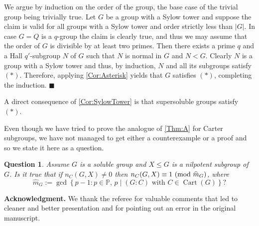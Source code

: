 \documentclass[a4paper,12pt,reqno]{amsart}
\newtheorem{question}{Question}
\numberwithin{equation}{section}
\DeclareMathOperator{\cart}{Cart}
\renewcommand{\leq}{\leqslant}
\newcommand{\md}[1]{\,\left(\textnormal{mod}\ #1\right)}
\newenvironment{proofof}{{\bf {Proof.} }}{\hfill $\blacksquare$ \\}
\begin{document}
\begin{proofof}
We argue by induction on the order of the group,
the base case of the trivial group being trivially true.
Let $G$ be a group with a Sylow tower and suppose the
claim is valid for all groups with a Sylow tower and order
strictly less than $|G|$. In case $G=Q$ is a $q$-group the claim is clearly true, and thus we may assume that the order of $G$  is divisible by at least two primes.  
Then there exists a prime $q$ and a Hall $q'$-subgroup $N$
of $G$ such that $N$ is normal in $G$ and $N < G$. 
Clearly $N$ is a  group with a Sylow tower and thus, by induction, 
$N$ and all its subgroups satisfy $(*)$.
Therefore, applying \autoref{Cor:Asterisk} yields that $G$
satisfies $(*)$, completing the induction.
\end{proofof}

A direct consequence of \autoref{Cor:SylowTower}
is that supersoluble groups satisfy $(*)$. 

Even though we have tried to prove the analogue of \autoref{Thm:A} 
for Carter subgroups, we have not managed to get either a counterexample 
or a proof and so we state it here as a question.
\begin{question}\label{Conj:Carter}
Assume $G$ is a soluble group and $X\leq G$ is a nilpotent subgroup of $G$. 
Is it true that if  $n_C(G,X) \neq 0$ then  $n_C(G,X) \equiv 1\md{\widehat{m}_G}$, 
where 
\[
\widehat{m}_G:= \gcd\left\{p-1: p\in\mathbb{P},\, p \mid (G:C) \mbox{ with } C\in\cart(G)\right\}? 
\]
\end{question}  

{\bf Acknowledgment.} 
We thank the referee for valuable comments that led to cleaner and better presentation and 
for pointing out an error in the original manuscript.





\end{document}
